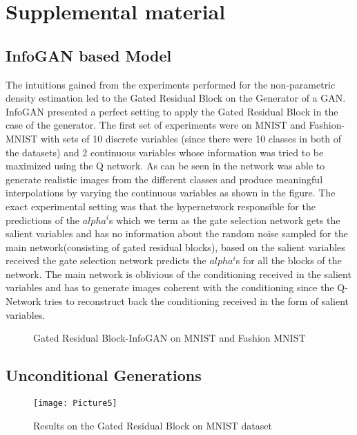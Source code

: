 
\section{Supplemental material}


\subsection{InfoGAN based Model}
The intuitions gained from the experiments performed for the non-parametric density estimation led to the Gated Residual Block on the Generator of a GAN. InfoGAN \cite{chen2016infogan} presented a perfect setting to apply the Gated Residual Block in the case of the generator. The first set of experiments were on MNIST and Fashion-MNIST with sets of 10 discrete variables (since there were 10 classes in both of the datasets) and 2 continuous variables whose information was tried to be maximized using the Q network. As can be seen in  the network was able to generate realistic images from the different classes and produce meaningful interpolations by varying the continuous variables as shown in the figure. The exact experimental setting was that the hypernetwork responsible for the predictions of the $alpha^i$s which we term as the gate selection network gets the salient variables and has no information about the random noise sampled for the main network(consisting of gated residual blocks), based on the salient variables received the gate selection network predicts the  $alpha^i$s for all the blocks of the network. The main network is oblivious of the conditioning received in the salient variables and has to generate images coherent with the conditioning since the Q-Network tries to reconstruct back the conditioning received in the form of salient variables. 

\begin{figure}[t]%
    \centering
    \caption{Gated Residual Block-InfoGAN on MNIST and Fashion MNIST }
    \label{fig:infogan_unconditional}
    \vspace{-3mm}
\end{figure}

\subsection{Unconditional Generations}
\begin{figure}[t]
    \centering
    \texttt{[image: Picture5]}
    \caption{Results on the Gated Residual Block on MNIST dataset}\label{fig:grb_mnist}
    \vspace{-4mm}
\end{figure}

